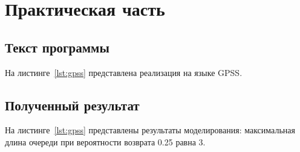 \chapter{Практическая часть}

\vspace{-0.5cm}
\section{Текст программы}
\vspace{-0.5cm}

На листинге~\ref{lst:gpss} представлена реализация на языке GPSS.


\vspace{-0.5cm}
\section{Полученный результат}
\vspace{-0.5cm}

На листинге~\ref{lst:gpss} представлены результаты моделирования: максимальная
длина очереди при вероятности возврата 0.25 равна 3.

